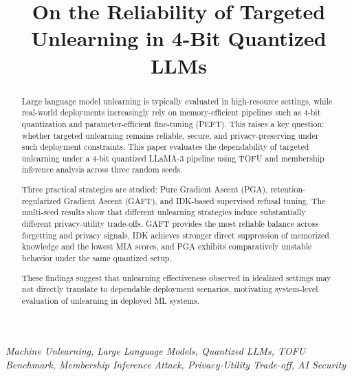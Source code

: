\documentclass[conference]{IEEEtran}
\begin{document}
\title{On the Reliability of Targeted Unlearning in 4-Bit Quantized LLMs}

\author{
}

\maketitle

\begin{abstract}
Large language model unlearning is typically evaluated in high-resource settings, while real-world deployments increasingly rely on memory-efficient pipelines such as 4-bit quantization and parameter-efficient fine-tuning (PEFT). This raises a key question: whether targeted unlearning remains reliable, secure, and privacy-preserving under such deployment constraints. This paper evaluates the dependability of targeted unlearning under a 4-bit quantized LLaMA-3 pipeline using TOFU and membership inference analysis across three random seeds.

Three practical strategies are studied: Pure Gradient Ascent (PGA), retention-regularized Gradient Ascent (GAFT), and IDK-based supervised refusal tuning. The multi-seed results show that different unlearning strategies induce substantially different privacy-utility trade-offs. GAFT provides the most reliable balance across forgetting and privacy signals, IDK achieves stronger direct suppression of memorized knowledge and the lowest MIA scores, and PGA exhibits comparatively unstable behavior under the same quantized setup.

These findings suggest that unlearning effectiveness observed in idealized settings may not directly translate to dependable deployment scenarios, motivating system-level evaluation of unlearning in deployed ML systems.
\end{abstract}

\renewcommand\IEEEkeywordsname{Keywords}
\begin{IEEEkeywords}
\textit{Machine Unlearning, Large Language Models, Quantized LLMs, TOFU Benchmark, Membership Inference Attack, Privacy-Utility Trade-off, AI Security}
\end{IEEEkeywords}
\end{document}
